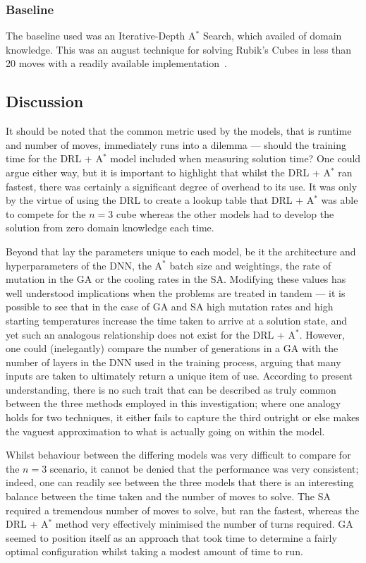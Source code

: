 \documentclass[UKenglish]{svproc}
\begin{document}
\subsubsection{Baseline}
The baseline used was an Iterative-Depth A$^{\ast}$ Search, which availed of domain knowledge. This was an august technique for solving Rubik's Cubes in less than 20 moves with a readily available implementation~\cite{Shoukat2019}.

\subsection{Discussion}
It should be noted that the common metric used by the models, that is runtime and number of moves, immediately runs into a dilemma --- should the training time for the DRL + A$^{\ast}$ model included when measuring solution time?  One could argue either way, but it is important to highlight that whilst the DRL + A$^{\ast}$ ran fastest, there was certainly a significant degree of overhead to its use. It was only by the virtue of using the DRL to create a lookup table that DRL + A$^{\ast}$ was able to compete for the $n=3$ cube whereas the other models had to develop the solution from zero domain knowledge each time.

Beyond that lay the parameters unique to each model, be it the architecture and hyperparameters of the DNN, the A$^{\ast}$ batch size and weightings, the rate of mutation in the GA or the cooling rates in the SA. Modifying these values has well understood implications when the problems are treated in tandem --- it is possible to see that in the case of GA and SA high mutation rates and high starting temperatures increase the time taken to arrive at a solution state, and yet such an analogous relationship does not exist for the DRL + A$^{\ast}$. However, one could (inelegantly) compare the number of generations in a GA with the number of layers in the DNN used in the training process, arguing that many inputs are taken to ultimately return a unique item of use. According to present understanding, there is no such trait that can be described as truly common between the three methods employed in this investigation; where one analogy holds for two techniques, it either fails to capture the third outright or else makes the vaguest approximation to what is actually going on within the model.

Whilst behaviour between the differing models was very difficult to compare for the $n=3$ scenario, it cannot be denied that the performance was very consistent; indeed, one can readily see between the three models that there is an interesting balance between the time taken and the number of moves to solve. The SA required a tremendous number of moves to solve, but ran the fastest, whereas the DRL + A$^{\ast}$ method very effectively minimised the number of turns required. GA seemed to position itself as an approach that took time to determine a fairly optimal configuration whilst taking a modest amount of time to run.
\end{document}
